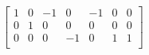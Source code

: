 \documentclass{article}
\begin{document}
 $
\left[
\begin{array}{c|c|c|c|c|c|c}
1 & 0 & -1 & 0 & -1 & 0 & 0 \\
0 & 1 & 0 & 0 & 0 & 0 & 0 \\
0 & 0 & 0 & -1 & 0 & 1 & 1 \\
\end{array}
\right] $
\end{document}
